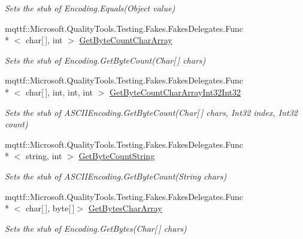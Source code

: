 \begin{DoxyCompactItemize}
\begin{DoxyCompactList}\small\item\em Sets the stub of Encoding.\-Equals(\-Object value)\end{DoxyCompactList}\item 
mqttf\-::\-Microsoft.\-Quality\-Tools.\-Testing.\-Fakes.\-Fakes\-Delegates.\-Func\\*
$<$ char\mbox{[}$\,$\mbox{]}, int $>$ \hyperlink{class_system_1_1_text_1_1_fakes_1_1_stub_a_s_c_i_i_encoding_a8b3ab6e0a9519f52c72f7780633a670f}{Get\-Byte\-Count\-Char\-Array}
\begin{DoxyCompactList}\small\item\em Sets the stub of Encoding.\-Get\-Byte\-Count(\-Char\mbox{[}$\,$\mbox{]} chars)\end{DoxyCompactList}\item 
mqttf\-::\-Microsoft.\-Quality\-Tools.\-Testing.\-Fakes.\-Fakes\-Delegates.\-Func\\*
$<$ char\mbox{[}$\,$\mbox{]}, int, int, int $>$ \hyperlink{class_system_1_1_text_1_1_fakes_1_1_stub_a_s_c_i_i_encoding_a0f6bff8d3d34a35a9309973bb8614ccb}{Get\-Byte\-Count\-Char\-Array\-Int32\-Int32}
\begin{DoxyCompactList}\small\item\em Sets the stub of A\-S\-C\-I\-I\-Encoding.\-Get\-Byte\-Count(\-Char\mbox{[}$\,$\mbox{]} chars, Int32 index, Int32 count)\end{DoxyCompactList}\item 
mqttf\-::\-Microsoft.\-Quality\-Tools.\-Testing.\-Fakes.\-Fakes\-Delegates.\-Func\\*
$<$ string, int $>$ \hyperlink{class_system_1_1_text_1_1_fakes_1_1_stub_a_s_c_i_i_encoding_accee292e7ea8b241a7cc536091ad1ced}{Get\-Byte\-Count\-String}
\begin{DoxyCompactList}\small\item\em Sets the stub of A\-S\-C\-I\-I\-Encoding.\-Get\-Byte\-Count(\-String chars)\end{DoxyCompactList}\item 
mqttf\-::\-Microsoft.\-Quality\-Tools.\-Testing.\-Fakes.\-Fakes\-Delegates.\-Func\\*
$<$ char\mbox{[}$\,$\mbox{]}, byte\mbox{[}$\,$\mbox{]}$>$ \hyperlink{class_system_1_1_text_1_1_fakes_1_1_stub_a_s_c_i_i_encoding_a5b6a6923cef900fa435c7c0766f78850}{Get\-Bytes\-Char\-Array}
\begin{DoxyCompactList}\small\item\em Sets the stub of Encoding.\-Get\-Bytes(\-Char\mbox{[}$\,$\mbox{]} chars)\end{DoxyCompactList}\item 

\end{DoxyCompactItemize}
